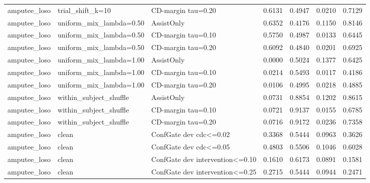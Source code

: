 \begin{table}[!t]
\begin{tabular}{lllrrrr}
amputee\_loso & trial\_shift\_k=10 & CD-margin tau=0.20 & 0.6131 & 0.4947 & 0.0210 & 0.7129 \\
amputee\_loso & uniform\_mix\_lambda=0.50 & AssistOnly & 0.6352 & 0.4176 & 0.1150 & 0.8146 \\
amputee\_loso & uniform\_mix\_lambda=0.50 & CD-margin tau=0.10 & 0.5750 & 0.4987 & 0.0133 & 0.6445 \\
amputee\_loso & uniform\_mix\_lambda=0.50 & CD-margin tau=0.20 & 0.6092 & 0.4840 & 0.0201 & 0.6925 \\
amputee\_loso & uniform\_mix\_lambda=1.00 & AssistOnly & 0.0000 & 0.5024 & 0.1377 & 0.6425 \\
amputee\_loso & uniform\_mix\_lambda=1.00 & CD-margin tau=0.10 & 0.0214 & 0.5493 & 0.0117 & 0.4186 \\
amputee\_loso & uniform\_mix\_lambda=1.00 & CD-margin tau=0.20 & 0.0106 & 0.4995 & 0.0218 & 0.4885 \\
amputee\_loso & within\_subject\_shuffle & AssistOnly & 0.0731 & 0.8854 & 0.1202 & 0.8615 \\
amputee\_loso & within\_subject\_shuffle & CD-margin tau=0.10 & 0.0721 & 0.9137 & 0.0155 & 0.6785 \\
amputee\_loso & within\_subject\_shuffle & CD-margin tau=0.20 & 0.0716 & 0.9172 & 0.0236 & 0.7358 \\
amputee\_loso & clean & ConfGate dev cdc<=0.02 & 0.3368 & 0.5444 & 0.0963 & 0.3626 \\
amputee\_loso & clean & ConfGate dev cdc<=0.05 & 0.4803 & 0.5506 & 0.1046 & 0.6028 \\
amputee\_loso & clean & ConfGate dev intervention<=0.10 & 0.1610 & 0.6173 & 0.0891 & 0.1581 \\
amputee\_loso & clean & ConfGate dev intervention<=0.25 & 0.2715 & 0.5444 & 0.0944 & 0.2471 \\
\bottomrule
\end{tabular}
\end{table}
